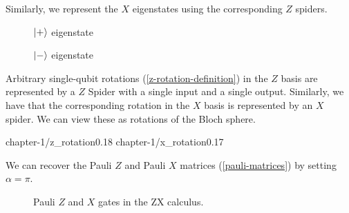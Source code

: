 Similarly, we represent the $X$ eigenstates using the corresponding $Z$ spiders.

\begin{figure}[H]
\centering
\begin{minipage}{.4\textwidth}
    \centering
    \caption{$\ket +$ eigenstate}
\end{minipage}%
\begin{minipage}{.4\textwidth}
    \centering
    \caption{$\ket -$ eigenstate}
\end{minipage}
\end{figure}

Arbitrary single-qubit rotations (\ref{z-rotation-definition}) in the $Z$ basis are represented by a $Z$ Spider with a single input and a single output. Similarly, we have that the corresponding rotation in the $X$ basis is represented by an $X$ spider. We can view these as rotations of the Bloch sphere.

{chapter-1/z_rotation}{0.18}
\vspace*{-15pt}
{chapter-1/x_rotation}{0.17}

We can recover the Pauli $Z$ and Pauli $X$ matrices (\ref{pauli-matrices}) by setting $\alpha = \pi$.

\begin{figure}[H]
\centering
{}
\caption{Pauli $Z$ and $X$ gates in the ZX calculus.}
\end{figure}

